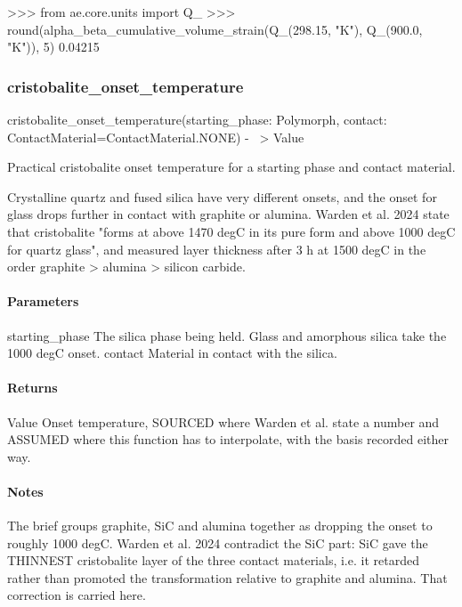 \documentclass[10pt,a4paper,twoside]{report}
\begin{document}
\begin{doctestblock}
>>> from ae.core.units import Q_
>>> round(alpha_beta_cumulative_volume_strain(Q_(298.15, "K"), Q_(900.0, "K")), 5)
0.04215
\end{doctestblock}

\subsubsection*{cristobalite\_onset\_temperature}

\begin{verbatimsmall}
cristobalite_onset_temperature(starting_phase: Polymorph, contact: ContactMaterial=ContactMaterial.NONE) -
    \ > Value
\end{verbatimsmall}

Practical cristobalite onset temperature for a starting phase and contact material.

Crystalline quartz and fused silica have very different onsets, and the onset for glass drops further in contact with graphite or alumina. Warden et al. 2024 state that cristobalite "forms at above 1470 degC in its pure form and above 1000 degC for quartz glass", and measured layer thickness after 3 h at 1500 degC in the order graphite > alumina > silicon carbide.

\paragraph*{Parameters}

starting\_phase The silica phase being held. Glass and amorphous silica take the 1000 degC onset. contact Material in contact with the silica.

\paragraph*{Returns}

Value Onset temperature, SOURCED where Warden et al. state a number and ASSUMED where this function has to interpolate, with the basis recorded either way.

\paragraph*{Notes}

The brief groups graphite, SiC and alumina together as dropping the onset to roughly 1000 degC. Warden et al. 2024 contradict the SiC part: SiC gave the THINNEST cristobalite layer of the three contact materials, i.e. it retarded rather than promoted the transformation relative to graphite and alumina. That correction is carried here.
\end{document}
